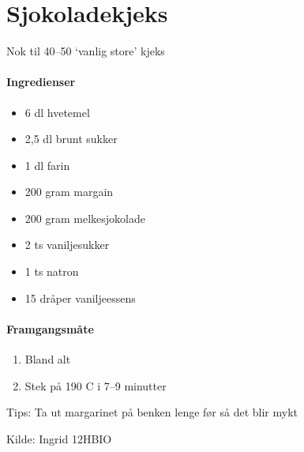 \section{﻿Sjokoladekjeks}
Nok til 40--50 `vanlig store' kjeks

\paragraph{Ingredienser}
\begin{itemize}[noitemsep]
	\item 6 dl hvetemel
	\item 2,5 dl brunt sukker
	\item 1 dl farin
	\item 200 gram margain
	\item 200 gram melkesjokolade
	\item 2 ts vaniljesukker
	\item 1 ts natron
	\item 15 dråper vaniljeessens
\end{itemize}

\paragraph{Framgangsmåte}
\begin{enumerate}[noitemsep]
	\item Bland alt
	\item Stek på 190 \degree C i 7--9 minutter
\end{enumerate}

Tips: Ta ut margarinet på benken lenge før så det blir mykt

Kilde: Ingrid 12HBIO
